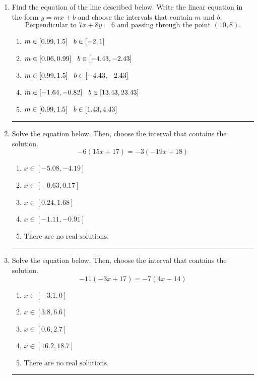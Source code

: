 \documentclass[14pt]{extbook}
\newcommand{\litem}[1]{\item#1\hspace*{-1cm}\rule{\textwidth}{0.4pt}}
\begin{document}
\begin{enumerate}
\litem{
Find the equation of the line described below. Write the linear equation in the form $ y=mx+b $ and choose the intervals that contain $m$ and $b$.\[ \text{Perpendicular to } 7 x + 8 y = 6 \text{ and passing through the point } (10, 8). \]\begin{enumerate}[label=\Alph*.]
\item \( m \in [0.99, 1.5] \hspace*{3mm} b \in [-2, 1] \)
\item \( m \in [0.06, 0.99] \hspace*{3mm} b \in [-4.43, -2.43] \)
\item \( m \in [0.99, 1.5] \hspace*{3mm} b \in [-4.43, -2.43] \)
\item \( m \in [-1.64, -0.82] \hspace*{3mm} b \in [13.43, 23.43] \)
\item \( m \in [0.99, 1.5] \hspace*{3mm} b \in [1.43, 4.43] \)

\end{enumerate} }
\litem{
Solve the equation below. Then, choose the interval that contains the solution.\[ -6(15x + 17) = -3(-19x + 18) \]\begin{enumerate}[label=\Alph*.]
\item \( x \in [-5.08, -4.19] \)
\item \( x \in [-0.63, 0.17] \)
\item \( x \in [0.24, 1.68] \)
\item \( x \in [-1.11, -0.91] \)
\item \( \text{There are no real solutions.} \)

\end{enumerate} }
\litem{
Solve the equation below. Then, choose the interval that contains the solution.\[ -11(-3x + 17) = -7(4x -14) \]\begin{enumerate}[label=\Alph*.]
\item \( x \in [-3.1, 0] \)
\item \( x \in [3.8, 6.6] \)
\item \( x \in [0.6, 2.7] \)
\item \( x \in [16.2, 18.7] \)
\item \( \text{There are no real solutions.} \)


\end{enumerate}}
\end{enumerate}
\end{document}
